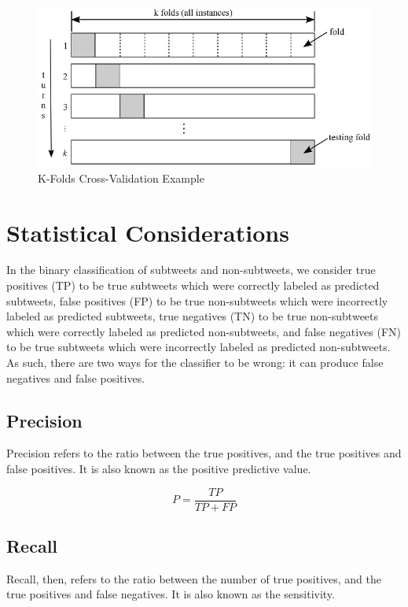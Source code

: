 \documentclass[11pt, twoside, reqno]{book}
\begin{document}
\begin{figure}[h]
	\centering
	\includegraphics{k_folds}
	\caption{K-Folds Cross-Validation Example \cite{k_folds}}
	\label{fig:k_folds}
\end{figure}

\section{Statistical Considerations}
\label{statistical_considerations}

In the binary classification of subtweets and non-subtweets, we consider true positives (TP) to be true subtweets which were correctly labeled as predicted subtweets, false positives (FP) to be true non-subtweets which were incorrectly labeled as predicted subtweets, true negatives (TN) to be true non-subtweets which were correctly labeled as predicted non-subtweets, and false negatives (FN) to be true subtweets which were incorrectly labeled as predicted non-subtweets. As such, there are two ways for the classifier to be wrong: it can produce false negatives and false positives.

\subsection{Precision}
\label{precision}

Precision refers to the ratio between the true positives, and the true positives and false positives. It is also known as the positive predictive value.

\[P=\frac{TP}{TP+FP}\] 

\subsection{Recall}
\label{recall}

Recall, then, refers to the ratio between the number of true positives, and the true positives and false negatives. It is also known as the sensitivity.
\end{document}
